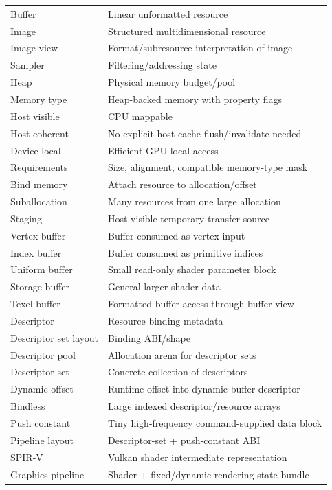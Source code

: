 {\begin{longtable}[]{@{}
  >{\raggedright\arraybackslash}p{}
  >{\raggedright\arraybackslash}p{}@{}}
Buffer & Linear unformatted resource \\
Image & Structured multidimensional resource \\
Image view & Format/subresource interpretation of image \\
Sampler & Filtering/addressing state \\
Heap & Physical memory budget/pool \\
Memory type & Heap-backed memory with property flags \\
Host visible & CPU mappable \\
Host coherent & No explicit host cache flush/invalidate needed \\
Device local & Efficient GPU-local access \\
Requirements & Size, alignment, compatible memory-type mask \\
Bind memory & Attach resource to allocation/offset \\
Suballocation & Many resources from one large allocation \\
Staging & Host-visible temporary transfer source \\
Vertex buffer & Buffer consumed as vertex input \\
Index buffer & Buffer consumed as primitive indices \\
Uniform buffer & Small read-only shader parameter block \\
Storage buffer & General larger shader data \\
Texel buffer & Formatted buffer access through buffer view \\
Descriptor & Resource binding metadata \\
Descriptor set layout & Binding ABI/shape \\
Descriptor pool & Allocation arena for descriptor sets \\
Descriptor set & Concrete collection of descriptors \\
Dynamic offset & Runtime offset into dynamic buffer descriptor \\
Bindless & Large indexed descriptor/resource arrays \\
Push constant & Tiny high-frequency command-supplied data block \\
Pipeline layout & Descriptor-set + push-constant ABI \\
SPIR-V & Vulkan shader intermediate representation \\
Graphics pipeline & Shader + fixed/dynamic rendering state bundle \\

\end{longtable}}
